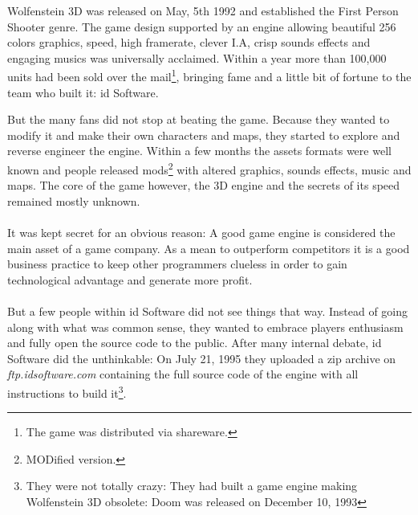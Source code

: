 Wolfenstein 3D was released on May, 5th 1992 and established the First Person Shooter genre. The game design supported by an engine allowing beautiful 256 colors graphics, speed, high framerate, clever I.A, crisp sounds effects and engaging musics was universally acclaimed. Within a year more than 100,000 units had been sold over the mail\footnote{The game was distributed via shareware.}, bringing fame and a little bit of fortune to the team who built it: id Software.\\
\par
\begin{figure}[H]
\centering
{}
\end{figure}
\par
But the many fans did not stop at beating the game. Because they wanted to modify it and make their own characters and maps, they started to explore and reverse engineer the engine. Within a few months the assets formats were well known and people released mods\footnote{MODified version.} with altered graphics, sounds effects, music and maps. The core of the game however, the 3D engine and the secrets of its speed remained mostly unknown.\\
\\
It was kept secret for an obvious reason: A good game engine is considered the main asset of a game company. As a mean to outperform competitors it is a good business practice to keep other programmers clueless in order to gain technological advantage and generate more profit.\\
\\
But a few people within id Software did not see things that way. Instead of going along with what was common sense, they wanted to embrace players enthusiasm and fully open the source code to the public. After many internal debate, id Software did the unthinkable: On July 21, 1995 they uploaded a zip archive on \emph{ftp.idsoftware.com} containing the full source code of the engine with all instructions to build it\footnote{They were not totally crazy: They had built a game engine making Wolfenstein 3D obsolete: Doom was released on December 10, 1993}.\\

